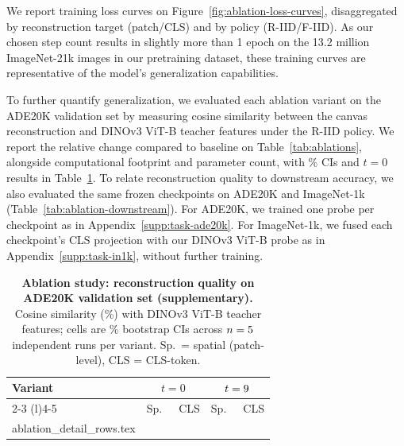\documentclass{article}
\makeatletter
\newcommand{\inputrows}[1]{\@@input #1 }
\makeatother
\begin{document}
We report training loss curves on Figure~\ref{fig:ablation-loss-curves}, disaggregated by reconstruction target (patch/CLS) and by policy (R-IID/F-IID).
As our chosen step count results in slightly more than 1 epoch on the 13.2 million ImageNet-21k images in our pretraining dataset, these training curves are representative of the model's generalization capabilities.

To further quantify generalization, we evaluated each ablation variant on the ADE20K validation set by measuring cosine similarity between the canvas reconstruction and DINOv3 ViT-B teacher features under the R-IID policy.
We report the relative change compared to baseline on Table~\ref{tab:ablations}, alongside computational footprint and parameter count, with \bootstrapCiPct\% CIs and $t = 0$ results in Table~\ref{tab:ablation-eval-supp}.
To relate reconstruction quality to downstream accuracy, we also evaluated the same frozen checkpoints on ADE20K and ImageNet-1k (Table~\ref{tab:ablation-downstream}). For ADE20K, we trained one probe per checkpoint as in Appendix~\ref{supp:task-ade20k}. For ImageNet-1k, we fused each checkpoint's CLS projection with our DINOv3 ViT-B probe as in Appendix~\ref{supp:task-in1k}, without further training.

\begin{table}[t]
  \caption{\textbf{Ablation study: reconstruction quality on ADE20K validation set (supplementary).}
  Cosine similarity (\%) with DINOv3 ViT-B teacher features; cells are \bootstrapCiPct\% bootstrap CIs across $n = 5$ independent \ablPolicyName{} runs per variant.
  Sp.\ = spatial (patch-level), CLS = CLS-token.}
  \label{tab:ablation-eval-supp}
  \centering
  \small
  \begin{tabular}{lcccc}
    \toprule
    \multirow{2}{*}{\textbf{Variant}}
      & \multicolumn{2}{c}{\textbf{$t = 0$}}
      & \multicolumn{2}{c}{\textbf{$t = 9$}} \\
    \cmidrule(l){2-3} \cmidrule(l){4-5}
    & Sp.\ & CLS & Sp.\ & CLS \\
    \midrule
    \inputrows{ablation_detail_rows.tex}
    \bottomrule
  \end{tabular}
\end{table}
\end{document}
